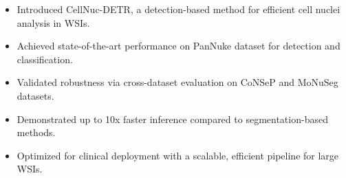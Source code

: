 \begin{itemize}
    \item Introduced CellNuc-DETR, a detection-based method for efficient cell nuclei analysis in WSIs.
    \item Achieved state-of-the-art performance on PanNuke dataset for detection and classification.
    \item Validated robustness via cross-dataset evaluation on CoNSeP and MoNuSeg datasets.
    \item Demonstrated up to 10x faster inference compared to segmentation-based methods.
    \item Optimized for clinical deployment with a scalable, efficient pipeline for large WSIs.
\end{itemize}